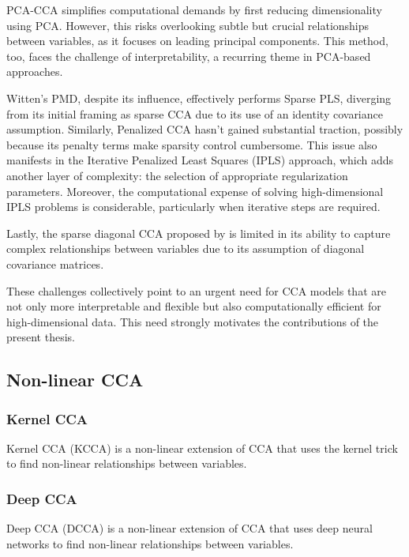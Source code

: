 PCA-CCA simplifies computational demands by first reducing dimensionality using PCA. However, this risks overlooking subtle but crucial relationships between variables, as it focuses on leading principal components.
This method, too, faces the challenge of interpretability, a recurring theme in PCA-based approaches.

Witten's PMD, despite its influence, effectively performs Sparse PLS, diverging from its initial framing as sparse CCA due to its use of an identity covariance assumption.
Similarly, Penalized CCA \cite{parkhomenko2009sparse} hasn't gained substantial traction, possibly because its penalty terms make sparsity control cumbersome.
This issue also manifests in the Iterative Penalized Least Squares (IPLS) approach, which adds another layer of complexity: the selection of appropriate regularization parameters.
Moreover, the computational expense of solving high-dimensional IPLS problems is considerable, particularly when iterative steps are required.

Lastly, the sparse diagonal CCA proposed by \cite{asteris2016simple} is limited in its ability to capture complex relationships between variables due to its assumption of diagonal covariance matrices.

These challenges collectively point to an urgent need for CCA models that are not only more interpretable and flexible but also computationally efficient for high-dimensional data.
This need strongly motivates the contributions of the present thesis.


\subsection{Non-linear CCA}

\subsubsection{Kernel CCA}

Kernel CCA (KCCA) is a non-linear extension of CCA that uses the kernel trick to find non-linear relationships between variables.

\subsubsection{Deep CCA}

Deep CCA (DCCA) is a non-linear extension of CCA that uses deep neural networks to find non-linear relationships between variables.



